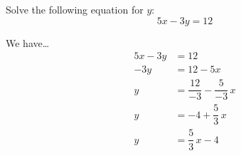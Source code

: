 \documentclass[11pt,letterpaper]{article}
\begin{document}
\newpage





 Solve the following equation for $y$:
	\[
	5x - 3y= 12
	\] \pspace

\sol We have\dots
	\[
	\begin{aligned}
	5x - 3y&= 12 \\
	-3y&= 12 - 5x \\
	y&= \dfrac{12}{-3} - \dfrac{5}{-3}\,x \\
	y&= -4 + \dfrac{5}{3}\,x \\
	y&= \dfrac{5}{3}\,x - 4
	\end{aligned}
	\]


\end{document}
